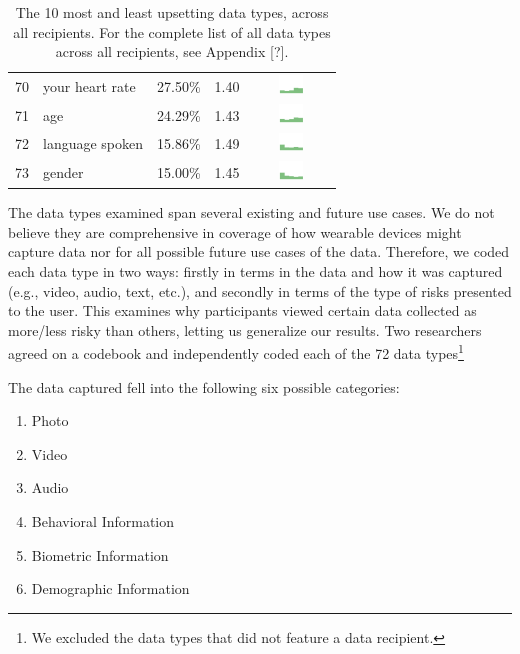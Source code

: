 \begin{table}[t]
\begin{center}
\begin{tabular}{| r | l | r | r |c |}
70 & your heart rate & 27.50\% & 1.40 & \includegraphics[width = 2cm, height = 0.5cm]{tex-inputs/data10/learnedyourheartratecombined} \\
71 & age & 24.29\% & 1.43 & \includegraphics[width = 2cm, height = 0.5cm]{tex-inputs/data10/learnedyouragecombined}\\
72 & language spoken & 15.86\% & 1.49 & \includegraphics[width = 2cm, height = 0.5cm]{tex-inputs/data10/learnedthelanguageyouwerespeakingcombined}\\
73 & gender & 15.00\% & 1.45 & \includegraphics[width = 2cm, height = 0.5cm]{tex-inputs/data10/learnedyourgendercombined}\\ 
\hline
\end{tabular}
\caption{The 10 most and least upsetting data types, across all recipients. For the complete list of all data types across all recipients, see Appendix [?].}
\label{top10-table}
\end{center}
\end{table}

The data types examined span several existing and future use cases. We do not believe they are comprehensive in coverage of how wearable devices might capture data nor for all possible future use cases of the data. Therefore, we coded each data type in two ways: firstly in terms in the data and how it was captured (e.g., video, audio, text, etc.), and  secondly in terms of the type of risks presented to the user. This examines why participants viewed certain data collected as more/less risky than others, letting us  generalize our results. Two researchers agreed on a codebook and independently coded each of the 72 data types\footnote{We excluded the data types that did not feature a data recipient.} 

The data captured fell into the following six possible categories:

\begin{enumerate}[topsep=0pt,itemsep=-1ex,partopsep=1ex,parsep=1ex]
\item Photo
\item Video
\item Audio
\item Behavioral Information
\item Biometric Information
\item Demographic Information
\end{enumerate}

